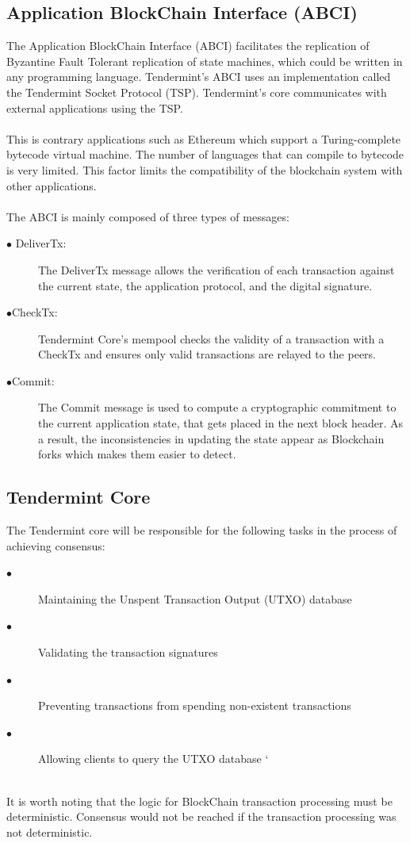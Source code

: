 \documentclass[a4paper,twoside,phd]{BYUPhys}
\begin{document}
\subsection{Application BlockChain Interface (ABCI)}
The Application BlockChain Interface (ABCI) facilitates the replication of Byzantine Fault Tolerant replication of state machines, which could be written in any programming language. Tendermint's ABCI uses an implementation called the Tendermint Socket Protocol (TSP). Tendermint's core communicates with external applications using the TSP.
\\
\\
This is contrary applications such as Ethereum which support a Turing-complete bytecode virtual machine. The number of languages that can compile to bytecode is very limited. This factor limits the compatibility of the blockchain system with other applications.
\\
\\
The ABCI is mainly composed of three types of messages:
\begin{description}
\item[$\bullet$ DeliverTx:] The DeliverTx message allows the verification of each transaction against the current state,  the application protocol, and the digital signature.
\item[$\bullet$CheckTx:] Tendermint Core's mempool checks the validity of a transaction with a CheckTx and ensures only valid transactions are relayed to the peers.
\item[$\bullet$Commit:] The Commit message is used to compute a cryptographic commitment to the current application state, that gets placed in the next block header. As a result, the inconsistencies in updating the state appear as Blockchain forks which makes them easier to detect.
\end{description}

\subsection{Tendermint Core}
The Tendermint core will be responsible for the following tasks in the process of achieving consensus:
\begin{description}
\item[$\bullet$]Maintaining the Unspent Transaction Output (UTXO) database
\item[$\bullet$]Validating the transaction signatures
\item[$\bullet$]Preventing transactions from spending non-existent transactions
\item[$\bullet$]Allowing clients to query the UTXO database
`
\end{description}
\\
It is worth noting that the logic for BlockChain transaction processing must be deterministic. Consensus would not be reached if the transaction processing was not deterministic. 
\label{chap:LitReview}
\end{document}
